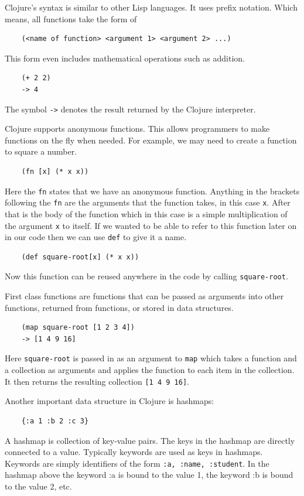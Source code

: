 \documentclass[12pt]{article}
\begin{document}
Clojure's syntax is similar to other Lisp languages. It uses prefix notation. Which means, all functions take the form of
\begin{verbatim}
	(<name of function> <argument 1> <argument 2> ...)
\end{verbatim}
This form even includes mathematical operations such as addition.
\begin{verbatim}
	(+ 2 2)
	-> 4
\end{verbatim}
The symbol \texttt{->} denotes the result returned by the Clojure interpreter.

Clojure supports anonymous functions. This allows programmers to make functions on the fly when needed. For example, we may need to create a function to square a number.
\begin{verbatim}
	(fn [x] (* x x))
\end{verbatim}
Here the \texttt{fn} states that we have an anonymous function. Anything in the brackets following the \texttt{fn} are the arguments that the function takes, in this case \texttt{x}. After that is the body of the function which in this case is a simple multiplication of the argument \texttt{x} to itself. If we wanted to be able to refer to this function later on in our code then we can use \texttt{def} to give it a name.
\begin{verbatim}
	(def square-root[x] (* x x))
\end{verbatim}
Now this function can be reused anywhere in the code by calling \texttt{square-root}.

First class functions are functions that can be passed as arguments into other functions, returned from functions, or stored in data structures.
\begin{verbatim}
	(map square-root [1 2 3 4])
	-> [1 4 9 16]
\end{verbatim}
Here \texttt{square-root} is passed in as an argument to \texttt{map} which takes a function and a collection as arguments and applies the function to each item in the collection. It then returns the resulting collection \texttt{[1 4 9 16]}.

Another important data structure in Clojure is hashmaps:
\begin{verbatim}
	{:a 1 :b 2 :c 3}
\end{verbatim}
A hashmap is collection of key-value pairs. The keys in the hashmap are directly connected to a value. Typically keywords are used as keys in hashmaps. Keywords are simply identifiers of the form \texttt{:a, :name, :student}. In the hashmap above the keyword :a is bound to the value 1, the keyword :b is bound to the value 2, etc. 
\end{document}
